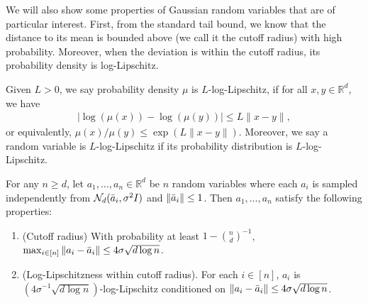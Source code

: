 \documentclass{article}\usepackage[a4paper,margin=20mm]{geometry}
\newcommand{\R}{\mathbb R}
\begin{document}
We will also show some properties of Gaussian random variables that are of particular interest.
First, from the standard tail bound, we know that the distance to its mean is bounded above (we call it the cutoff radius) with high probability. Moreover, when the deviation is within the cutoff radius, its probability density is log-Lipschitz. 

\begin{definition}\label{def:log-lipschitz}
    Given $L > 0$, we say probability density $\mu$ is $L$-log-Lipschitz, if for all $x, y\in \R^d$, we have
    \begin{align*}
        |\log(\mu(x)) - \log(\mu(y))| \leq L\|x - y\|,
    \end{align*}
    or equivalently, $\mu(x) / \mu(y) \leq \exp(L\|x - y\|)$.
    Moreover, we say a random variable is $L$-log-Lipschitz if its probability distribution is $L$-log-Lipschitz.
\end{definition}

\begin{lemma}\label{lem:cutoff-lipschitz-gaussian}
    For any $n \geq d$,
    let $a_1, \ldots, a_n \in \R^d$ be $n$ random variables where each $a_i$ is sampled independently from $\mathcal{N}_d(\Bar{a}_i, \sigma^2 I)$ and $\|\Bar{a}_i\| \leq 1$. Then $a_1, \ldots, a_n$ satisfy the following properties:
    \begin{enumerate}
        \item (Cutoff radius) With probability at least $1 - \binom{n}{d}^{-1}$, $\max_{i \in [n]} \|a_i - \Bar{a}_i\| \leq 4\sigma \sqrt{d \log n}$.
        \item (Log-Lipschitzness within cutoff radius). For each $i \in [n]$, $a_i$ is $(4\sigma^{-1} \sqrt{d\log n})$-log-Lipschitz conditioned on $\|a_i - \Bar{a}_i\| \leq 4\sigma \sqrt{d \log n}$.
    \end{enumerate}
\end{lemma}
\end{document}
